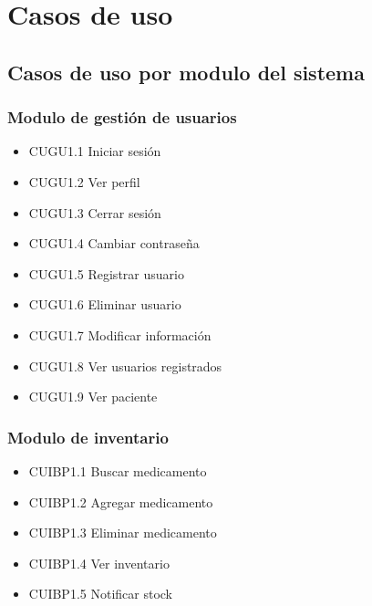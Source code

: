 \documentclass[12pt,letterpaper]{article}
\begin{document}
    \section{Casos de uso}
        \justify
            \subsection{Casos de uso por modulo del sistema}
                \subsubsection{Modulo de gestión de usuarios}
                \begin{itemize}
                    \item CUGU1.1 Iniciar sesión 
                    \item CUGU1.2 Ver perfil
                    \item CUGU1.3 Cerrar sesión 
                    \item CUGU1.4 Cambiar contraseña 
                    \item CUGU1.5 Registrar usuario 
                    \item CUGU1.6 Eliminar usuario 
                    \item CUGU1.7 Modificar información 
                    \item CUGU1.8 Ver usuarios registrados 
                    \item CUGU1.9 Ver paciente 
                \end{itemize}
                \subsubsection{Modulo de inventario}
                    \begin{itemize}
                        \item CUIBP1.1 Buscar medicamento 
                        \item CUIBP1.2 Agregar medicamento 
                        \item CUIBP1.3 Eliminar medicamento 
                        \item CUIBP1.4 Ver inventario 
                        \item CUIBP1.5 Notificar stock 
                    \end{itemize}
\end{document}
